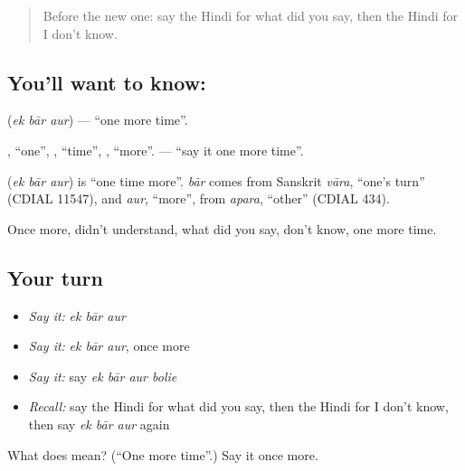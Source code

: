 \label{lesson:HI-C126-ekbaraur}



\begin{quote}
Before the new one: say the Hindi for what did you say, then the Hindi for I don't know.
\end{quote}

\subsection*{You'll want to know:   }
\textbf{  } (\emph{ek bār aur}) — \textquotedblleft{}one more time\textquotedblright{}.

\textbf{}, \textquotedblleft{}one\textquotedblright{}, \textbf{}, \textquotedblleft{}time\textquotedblright{}, \textbf{}, \textquotedblleft{}more\textquotedblright{}. \textbf{   } — \textquotedblleft{}say it one more time\textquotedblright{}.

\begin{cousinweb}
\textbf{  } (\emph{ek bār aur}) is \textquotedblleft{}one time more\textquotedblright{}. \emph{bār} comes from Sanskrit \emph{vāra}, \textquotedblleft{}one's turn\textquotedblright{} (CDIAL 11547), and \emph{aur}, \textquotedblleft{}more\textquotedblright{}, from \emph{apara}, \textquotedblleft{}other\textquotedblright{} (CDIAL 434).
\end{cousinweb}

\begin{grammarlens}[title={What you've built}]
Once more, didn't understand, what did you say, don't know, one more time.
\end{grammarlens}

\subsection*{Your turn}
\begin{itemize}
\raggedright
  \item \emph{Say it:} \emph{ek bār aur}
  \item \emph{Say it:} \emph{ek bār aur}, once more
  \item \emph{Say it:} say \emph{ek bār aur bolie}
  \item \emph{Recall:} say the Hindi for what did you say, then the Hindi for I don't know, then say \emph{ek bār aur} again
\end{itemize}

\begin{tcolorbox}[breakable,colback=teal!4,colframe=teal!35!black,title={Before you move on}]
What does    mean? (\textquotedblleft{}One more time\textquotedblright{}.) Say it once more.
\end{tcolorbox}
